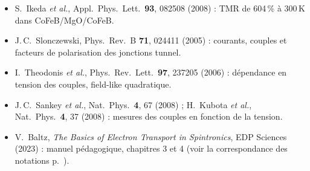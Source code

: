 \documentclass[11pt,a4paper]{article}
\begin{document}
\begin{itemize}
    (2001) : effet tunnel cohérent dans Fe/MgO/Fe.
  \item S.~Ikeda \emph{et al.}, Appl.\ Phys.\ Lett.\ \textbf{93}, 082508
    (2008) : TMR de 604\,\% à 300\,K dans CoFeB/MgO/CoFeB.
  \item J.\,C.~Slonczewski, Phys.\ Rev.\ B \textbf{71}, 024411 (2005) :
    courants, couples et facteurs de polarisation des jonctions tunnel.
  \item I.~Theodonis \emph{et al.}, Phys.\ Rev.\ Lett.\ \textbf{97}, 237205
    (2006) : dépendance en tension des couples, field-like quadratique.
  \item J.\,C.~Sankey \emph{et al.}, Nat.\ Phys.\ \textbf{4}, 67 (2008) ;
    H.~Kubota \emph{et al.}, Nat.\ Phys.\ \textbf{4}, 37 (2008) : mesures
    des couples en fonction de la tension.
  \item V.~Baltz, \emph{The Basics of Electron Transport in Spintronics},
    EDP Sciences (2023) : manuel pédagogique, chapitres 3 et 4 (voir la
    correspondance des notations p.~\pageref{sec:baltz}).
\end{itemize}
\end{document}
